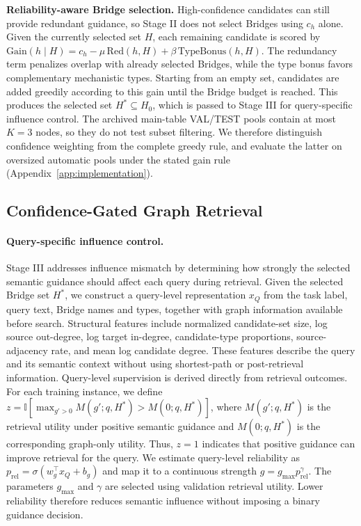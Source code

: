 \documentclass{article} %
\newcommand{\rev}[1]{{\color{blue}#1}}
\begin{document}
\noindent\textbf{Reliability-aware Bridge selection.} High-confidence candidates can still provide redundant guidance, so Stage II does not select Bridges using $c_h$ alone. Given the currently selected set $H$, each remaining candidate is scored by $\mathrm{Gain}(h\mid H)=c_h-\mu\,\mathrm{Red}(h,H)+\beta\,\mathrm{TypeBonus}(h,H)$. The redundancy term penalizes overlap with already selected Bridges, while the type bonus favors complementary mechanistic types. Starting from an empty set, candidates are added greedily according to this gain until the Bridge budget is reached. This produces the selected set $H^*\subseteq H_0$, which is passed to Stage III for query-specific influence control. \rev{The archived main-table VAL/TEST pools contain at most $K=3$ nodes, so they do not test subset filtering.} We therefore distinguish confidence weighting from the complete greedy rule, and evaluate the latter on oversized automatic pools under the stated gain rule (Appendix~\ref{app:implementation}).
\subsection{Confidence-Gated Graph Retrieval}
\label{sec:confidence_gate}

\paragraph{Query-specific influence control.}
Stage III addresses influence mismatch by determining how strongly the selected semantic guidance should affect each query during retrieval. Given the selected Bridge set $H^*$, we construct a query-level representation $x_Q$ from the task label, query text, Bridge names and types, together with graph information available before search. Structural features include normalized candidate-set size, log source out-degree, log target in-degree, candidate-type proportions, source-adjacency rate, and mean log candidate degree. These features describe the query and its semantic context without using shortest-path or post-retrieval information. Query-level supervision is derived directly from retrieval outcomes. For each training instance, we define $z=\mathbb{I}\!\left[\max_{g'>0}M(g';q,H^*)>M(0;q,H^*)\right]$, where $M(g';q,H^*)$ is the retrieval utility under positive semantic guidance and $M(0;q,H^*)$ is the corresponding graph-only utility. Thus, $z=1$ indicates that positive guidance can improve retrieval for the query. We estimate query-level reliability as $p_{\mathrm{rel}}=\sigma(w_g^\top x_Q+b_g)$ and map it to a continuous strength $g=g_{\max}p_{\mathrm{rel}}^\gamma$. The parameters $g_{\max}$ and $\gamma$ are selected using validation retrieval utility. Lower reliability therefore reduces semantic influence without imposing a binary guidance decision.
\end{document}
